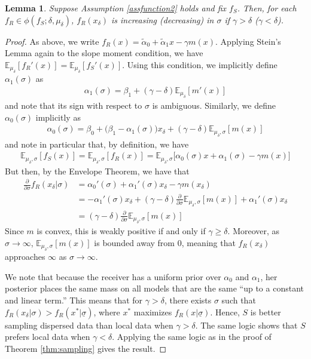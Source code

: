 \documentclass[11pt,dvipsnames]{article}
\newtheorem{lemma}{Lemma}
\begin{document}
\begin{appendix}
\begin{lemma}
Suppose Assumption \ref{assfunction2} holds and fix $f_S$.
Then, for each $f_R \in \phi(f_S; \delta,\mu_\delta)$, $f_R(x_\delta)$ is increasing (decreasing) in $\sigma$ if $\gamma>\delta$ ($\gamma<\delta$).
\end{lemma}	
\begin{proof}
As above, we write $
f_R(x) = \tilde{\alpha}_0 + \tilde{\alpha}_1 x-\gamma m(x)$.
Applying Stein's Lemma again to the slope moment condition, we have $\mathbb{E}_{\mu_\delta}[f_R'(x)]=\mathbb{E}_{\mu_\delta}[f_S'(x)]$.
Using this condition, we implicitly define $\alpha_1(\sigma)$ as
\begin{align*}
\alpha_1(\sigma) = \beta_1 +(\gamma-\delta)\mathbb{E}_{\mu_\delta}[m'(x)] 		
\end{align*}
and note that its sign with respect to $\sigma$ is ambiguous.
Similarly, we define $\alpha_0(\sigma)$ implicitly as
\begin{align*}
\alpha_0(\sigma)
= \beta_0 + \big(\beta_1- \alpha_1(\sigma)\big)x_\delta+(\gamma-\delta)\mathbb{E}_{\mu_\delta,\sigma}[m(x)]
\end{align*}
and note in particular that, by definition, we have
\begin{align*}
\mathbb{E}_{\mu_\delta,\sigma}[f_S(x)]=
\mathbb{E}_{\mu_\delta,\sigma}[f_R(x)]
=\mathbb{E}_{\mu_\delta,\sigma}\big[\alpha_0(\sigma)x +\alpha_1(\sigma)
-\gamma m(x)
\big]
\end{align*}
But then, by the Envelope Theorem, we have that
\begin{align*}
\frac{\partial}{\partial \sigma}
f_R(x_\delta|\sigma)
&= \alpha_0'(\sigma)+\alpha_1'(\sigma)x_\delta
- \gamma m(x_\delta)
\\
&=	-\alpha_1'(\sigma)x_\delta+(\gamma-\delta)\frac{\partial}{\partial \sigma}\mathbb{E}_{\mu_\delta,\sigma}[m(x)]+\alpha_1'(\sigma)x_\delta
\\
&= (\gamma-\delta)\frac{\partial}{\partial \sigma}\mathbb{E}_{\mu_\delta,\sigma}[m(x)]
\end{align*}
Since $m$ is convex, this is weakly positive if and only if $\gamma \geq \delta$.
Moreover, as $\sigma \to \infty$, $\mathbb{E}_{\mu_\delta,\sigma}[m(x)]$ is bounded away from $0$, meaning that $f_R(x_\delta)$ approaches $\infty$ as $\sigma \to \infty$.

We note that because the receiver has a uniform prior over $\alpha_0$ and $\alpha_1$, her posterior places the same mass on all models that are the same ``up to a constant and linear term.''
This means that for $\gamma > \delta$, there exists $\sigma$ such that $f_R(x_\delta|\sigma) > f_R(x^*|\underline{\sigma})$, where $x^*$ maximizes $f_R(x|\underline{\sigma})$.
Hence, $S$ is better sampling dispersed data than local data when $\gamma > \delta$.
The same logic shows that $S$ prefers local data when $\gamma < \delta$.
Applying the same logic as in the proof of Theorem \ref{thm:sampling} gives the result.
\end{proof}




\end{appendix}
\end{document}
